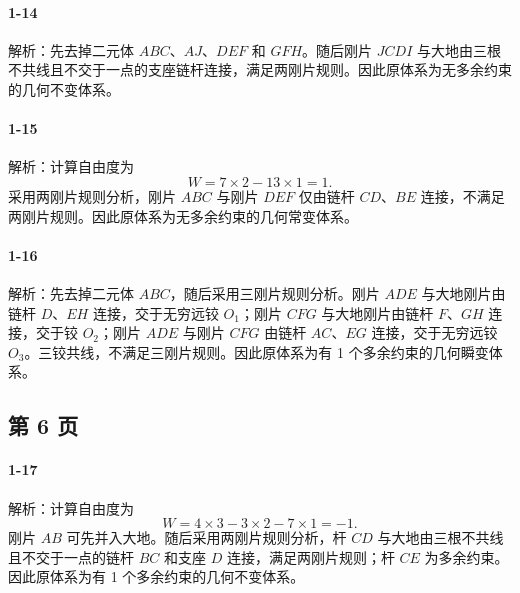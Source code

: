 \paragraph{1-14}
解析：先去掉二元体 $ABC$、$AJ$、$DEF$ 和 $GFH$。随后刚片 $JCDI$ 与大地由三根不共线且不交于一点的支座链杆连接，满足两刚片规则。因此原体系为无多余约束的几何不变体系。

\paragraph{1-15}
解析：计算自由度为
\[
W=7\times 2-13\times 1=1.
\]
采用两刚片规则分析，刚片 $ABC$ 与刚片 $DEF$ 仅由链杆 $CD$、$BE$ 连接，不满足两刚片规则。因此原体系为无多余约束的几何常变体系。

\paragraph{1-16}
解析：先去掉二元体 $ABC$，随后采用三刚片规则分析。刚片 $ADE$ 与大地刚片由链杆 $D$、$EH$ 连接，交于无穷远铰 $O_1$；刚片 $CFG$ 与大地刚片由链杆 $F$、$GH$ 连接，交于铰 $O_2$；刚片 $ADE$ 与刚片 $CFG$ 由链杆 $AC$、$EG$ 连接，交于无穷远铰 $O_3$。三铰共线，不满足三刚片规则。因此原体系为有 1 个多余约束的几何瞬变体系。

\subsection*{第 6 页}

\paragraph{1-17}
解析：计算自由度为
\[
W=4\times 3-3\times 2-7\times 1=-1.
\]
刚片 $AB$ 可先并入大地。随后采用两刚片规则分析，杆 $CD$ 与大地由三根不共线且不交于一点的链杆 $BC$ 和支座 $D$ 连接，满足两刚片规则；杆 $CE$ 为多余约束。因此原体系为有 1 个多余约束的几何不变体系。
